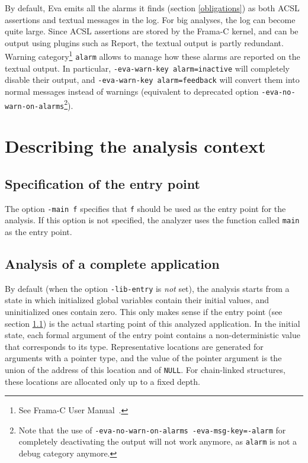 \documentclass[web]{frama-c-book}
\newcommand{\Eva}{\textsf{Eva}}
\begin{document}
By default, \Eva{} emits all the alarms it finds (section
\ref{obligations}) as both ACSL assertions and textual messages in the
log. For big analyses, the log can become quite large. Since ACSL
assertions are stored by the Frama-C kernel, and can be output using
plugins such as Report, the textual output is partly redundant. Warning
category\footnote{See Frama-C User Manual~\cite{FCUserMan}.}
\texttt{alarm} allows to manage how these alarms are reported on the
textual output. In particular, \texttt{-eva-warn-key alarm=inactive} will
completely disable their output, and \texttt{-eva-warn-key alarm=feedback}
will convert them into normal messages instead of warnings
(equivalent to deprecated option
\texttt{-eva-no-warn-on-alarms}\footnote{Note that the use of
  \texttt{-eva-no-warn-on-alarms -eva-msg-key=-alarm} for completely
  deactivating the output will not work anymore, as \texttt{alarm} is not a
  debug category anymore.}).

\section{Describing the analysis context}
\label{context}

\subsection{Specification of the entry point}
\label{entry}

The option \lstinline|-main f| specifies that \lstinline|f| should be
used as the entry point for the analysis. If this option is
not specified, the analyzer uses the function called \lstinline|main|
as the entry point.

\subsection{Analysis of a complete application}
\label{complete}

By default (when the option \lstinline|-lib-entry| is {\em not} set),
the analysis starts from a state 
in which initialized global variables
contain their initial values, and uninitialized ones contain zero.
This only makes sense if the entry point (see section \ref{entry}) is
the actual starting point of this analyzed application. 
In the initial state, each formal argument of the entry point contains 
a non-deterministic value that corresponds to its type. Representative
locations are generated for arguments with a pointer type,
and the value of the pointer argument is the union of the address
of this location and of \lstinline|NULL|. For chain-linked structures,
these locations are allocated only up to a fixed depth.
\end{document}
